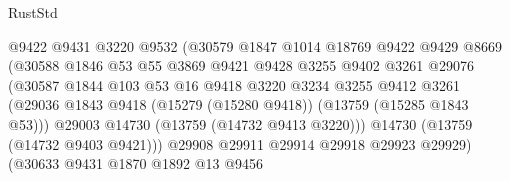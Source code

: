 \begin{lexlean}{RustStd}
\begin{coremodule}
                                    @9422
                                    @9431
                                    @3220
                                    @9532
                                    (@30579
                                      @1847
                                      @1014
                                      @18769
                                      @9422
                                      @9429
                                      @8669
                                      (@30588
                                        @1846
                                        @53
                                        @55
                                        @3869
                                        @9421
                                        @9428
                                        @3255
                                        @9402
                                        @3261
                                        @29076
                                        (@30587
                                          @1844
                                          @103
                                          @53
                                          @16
                                          @9418
                                          @3220
                                          @3234
                                          @3255
                                          @9412
                                          @3261
                                          (@29036
                                            @1843
                                            @9418
                                            (@15279 (@15280 @9418))
                                            (@13759 (@15285 @1843 @53)))
                                          @29003
                                          @14730
                                          (@13759 (@14732 @9413 @3220)))
                                        @14730
                                        (@13759 (@14732 @9403 @9421)))
                                      @29908
                                      @29911
                                      @29914
                                      @29918
                                      @29923
                                      @29929)
                                    (@30633
                                      @9431
                                      @1870
                                      @1892
                                      @13
                                      @9456

\end{coremodule}
\end{lexlean}
